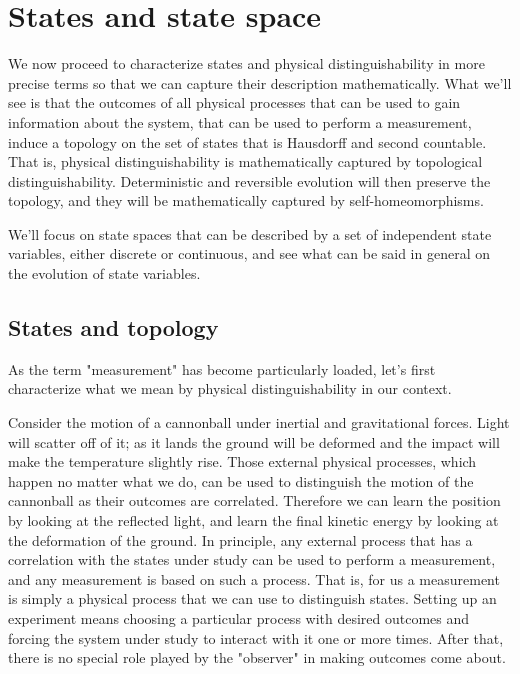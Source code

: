 \documentclass[aps,pra,10pt,twocolumn,floatfix,nofootinbib]{revtex4-1}
\numberwithin{equation}{section}
\theoremstyle{definition}
\begin{document}
\section{States and state space}



We now proceed to characterize states and physical distinguishability in more precise terms so that we can capture their description mathematically. What we'll see is that the outcomes of all physical processes that can be used to gain information about the system, that can be used to perform a measurement, induce a topology on the set of states that is Hausdorff and second countable. That is, physical distinguishability is mathematically captured by topological distinguishability. Deterministic and reversible evolution will then preserve the topology, and they will be mathematically captured by self-homeomorphisms.

We'll focus on state spaces that can be described by a set of independent state variables, either discrete or continuous, and see what can be said in general on the evolution of state variables.

\subsection{States and topology}

As the term "measurement" has become particularly loaded, let's first characterize what we mean by physical distinguishability in our context.

Consider the motion of a cannonball under inertial and gravitational forces. Light will scatter off of it; as it lands the ground will be deformed and the impact will make the temperature slightly rise. Those external physical processes, which happen no matter what we do, can be used to distinguish the motion of the cannonball as their outcomes are correlated. Therefore we can learn the position by looking at the reflected light, and learn the final kinetic energy by looking at the deformation of the ground. In principle, any external process that has a correlation with the states under study can be used to perform a measurement, and any measurement is based on such a process. That is, for us a measurement is simply a physical process that we can use to distinguish states. Setting up an experiment means choosing a particular process with desired outcomes and forcing the system under study to interact with it one or more times. After that, there is no special role played by the "observer" in making outcomes come about.
\end{document}

